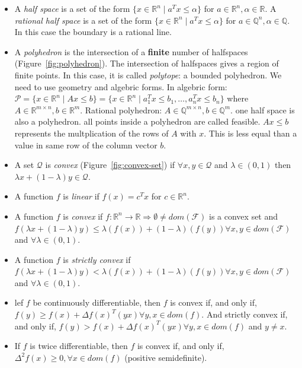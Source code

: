 \documentclass[main]{subfiles}
\begin{document}
\begin{itemize}

\item A \emph{half space} is a set of the form $\{ x \in \mathbb{R}^{n} \mid
a^{T} x \leq \alpha \}$ for $a \in \mathbb{R}^{n}, \alpha \in \mathbb{R}$.
\subitem A \emph{rational half space} is a set of the form $\{ x \in
\mathbb{R}^{n} \mid a^{T} x \leq \alpha \}$ for $a \in \mathbb{Q}^{n}, \alpha
\in \mathbb{Q}$. In this case the boundary is a rational line.

\item A \emph{polyhedron} is the intersection of a \textbf{finite} number of
halfspaces (Figure~\ref{fig:polyhedron}). The intersection of halfspaces gives
a region of finite points. In this case, it is called \emph{polytope}: a
bounded polyhedron. We need to use geometry and algebric forms. In algebric
form: $\mathcal{P} = \{ x \in \mathbb{R}^{n} \mid Ax \leq b \} = \{ x \in
\mathbb{R}^{n} \mid a_{1}^{T}x \leq b_{1}, \dots, a_{n}^{T}x \leq b_{n} \}$
where $A \in \mathbb{R}^{m \times n}, b \in \mathbb{R}^{m}$.
\subitem Rational polyhedron: $A \in \mathbb{Q}^{ m \times n}, b \in
\mathbb{Q}^{m}$.
\subitem one half space is also a polyhedron.
\subitem all points inside a polyhedron are called feasible.
\subitem $Ax \leq b$ represents the multplication of the rows of $A$ with $x$. This is less equal than a value in same row of the column vector $b$.

\item A set $\mathcal{Q}$ is \emph{convex} (Figure~\ref{fig:convex-set}) if
$\forall x, y \in \mathcal{Q}$ and $\lambda \in (0,1)$ then $\lambda x +
(1 - \lambda)y \in \mathcal{Q}$.

\item A function $f$ is \emph{linear} if $f(x) = c^{T}x$ for $c \in
\mathbb{R}^{n}$.

\item A function $f$ is \emph{convex} if $f: \mathbb{R}^{n} \rightarrow
\mathbb{R} \Rightarrow \emptyset \neq dom(\mathcal{F})$ is a convex set and
$f(\lambda x + (1-\lambda)y) \leq \lambda (f(x)) + (1-\lambda)(f(y)) \forall
x, y \in dom(\mathcal{F})$ and $\forall \lambda \in (0,1)$.

\item A function $f$ is \emph{strictly convex} if $f(\lambda x + (1-\lambda)y)
< \lambda (f(x)) + (1-\lambda)(f(y)) \forall x, y \in dom(\mathcal{F})$ and
$\forall \lambda \in (0,1)$.

\item lef $f$ be continuously differentiable, then $f$ is convex if, and only
if, $f(y) \geq f(x) + \Delta f(x)^{T}(yx) \forall y,x \in dom(f)$. And strictly
convex if, and only if, $f(y) > f(x) + \Delta f(x)^{T}(yx) \forall y,x \in
dom(f)$ and $y \neq x$.

\item If $f$ is twice differentiable, then $f$ is convex if, and only if,
$\Delta^{2} f(x) \geq 0, \forall x \in dom(f)$ (positive semidefinite).
\end{itemize}
\end{document}
